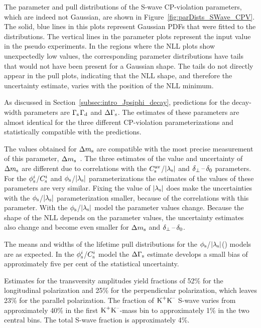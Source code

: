 The parameter and pull distributions of the S-wave CP-violation parameters, which are indeed not Gaussian, are shown in
Figure~\ref{fig:parDists_SWave_CPV}. The solid, blue lines in this plots represent Gaussian PDFs that were fitted to the distributions. The
vertical lines in the parameter plots represent the input value in the pseudo experiments. In the regions where the NLL plots show
unexpectedly low values, the corresponding parameter distributions have tails that would not have been present for a Gaussian shape. The
tails do not directly appear in the pull plots, indicating that the NLL shape, and therefore the uncertainty estimate, varies with the
position of the NLL minimum.

As discussed in Section~\ref{subsec:intro_Jpsiphi_decay}, predictions for the decay-width parameters are
$\Gamma_\text{s}$\textapprox$\Gamma_\text{d}$\unitsp\invps{} and $\Delta\Gamma_\text{s}$\unitsp\invps{}. The estimates of these
parameters are almost identical for the three different CP-violation parameterizations and statistically compatible with the predictions.

The values obtained for $\Delta m_\text{s}$ are compatible with the most precise measurement of this parameter,
$\Delta m_\text{s}$\unitsp\invps~\cite{LHCb-PAPER-2013-006}. The three estimates of the value and uncertainty of $\Delta m_\text{s}$ are
different due to correlations with the $C_\text{s}^\text{av}$/$|{\lambda_{\text{s}}}|$ and $\delta_{\perp}\,\text{--}\,\delta_{0}$ parameters. For the $\phi_\text{s}^{i}$/$C_\text{s}^{i}$ and
$\phi_\text{s}$/$|{\lambda_{\text{s}}}|$ parameterizations the estimates of the values of these parameters are very similar. Fixing the value of
$|{\lambda_{\text{s}}}|$ does make the uncertainties with the $\phi_\text{s}$/$|{\lambda_{\text{s}}}|$ parameterization smaller, because of the correlations with this
parameter. With the $\phi_\text{s}$/$|{\lambda_{\text{s}}}|$ model the parameter values change. Because the shape of the NLL depends on the parameter values, the
uncertainty estimates also change and become even smaller for $\Delta m_\text{s}$ and $\delta_{\perp}\,\text{--}\,\delta_{0}$.

The means and widths of the lifetime pull distributions for the $\phi_\text{s}$/$|{\lambda_{\text{s}}}|$() models are as expected. In the $\phi_\text{s}^{i}$/$C_\text{s}^{i}$
model the $\Delta\Gamma_\text{s}$ estimate develops a small bias of approximately five per cent of the statistical uncertainty.

Estimates for the transversity amplitudes yield fractions of 52\% for the longitudinal \BstoJpsiphi{} polarization and 25\% for the
perpendicular polarization, which leaves 23\% for the parallel polarization. The fraction of $\text{K}^\text{+}\text{K}^\text{--}$ S-wave varies from approximately 40\% in
the first $\text{K}^\text{+}\text{K}^\text{--}$-mass bin to approximately 1\% in the two central bins. The total S-wave fraction is approximately 4\%.

